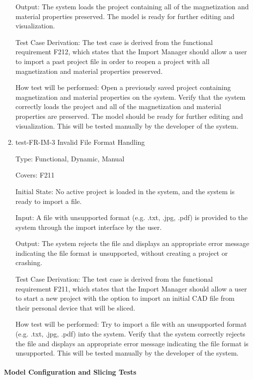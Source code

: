 \documentclass[12pt, titlepage]{article}
\begin{document}
\begin{enumerate}
Output: The system loads the project containing all of the magnetization and material properties preserved. The model is ready for further editing and visualization.

Test Case Derivation: The test case is derived from the functional requirement F212, which states that the Import Manager should allow a user to import a past project file in order to reopen a project with all magnetization and material properties preserved.
					
How test will be performed: Open a previously saved project containing magnetization and material properties on the system. Verify that the system correctly loads the project and all of the magnetization and material properties are preserved. The model should be ready for further editing and visualization. This will be tested manually by the developer of the system.

\item{test-FR-IM-3 Invalid File Format Handling\\}

Type: Functional, Dynamic, Manual

Covers: F211
					
Initial State: No active project is loaded in the system, and the system is ready to import a file.
					
Input: A file with unsupported format (e.g. .txt, .jpg, .pdf) is provided to the system through the import interface by the user.
					
Output: The system rejects the file and displays an appropriate error message indicating the file format is unsupported, without creating a project or crashing.

Test Case Derivation: The test case is derived from the functional requirement F211, which states that the Import Manager should allow a user to start a new project with the option to import an initial CAD file from their personal device that will be sliced. 
					
How test will be performed: Try to import a file with an unsupported format (e.g. .txt, .jpg, .pdf) into the system. Verify that the system correctly rejects the file and displays an appropriate error message indicating the file format is unsupported. This will be tested manually by the developer of the system.

\end{enumerate}

\paragraph{Model Configuration and Slicing Tests}
\end{document}
